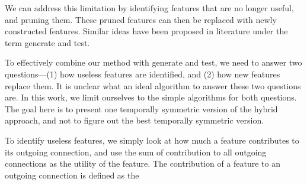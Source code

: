 \documentclass[twoside,11pt]{article}
\newcommand{\etal}{\textit{et al}.}
\begin{document}
We can address this limitation by identifying features that are no longer useful, and pruning them. These pruned features can then be replaced with newly constructed features. Similar ideas have been proposed in literature under the term generate and test. 

To effectively combine our method with generate and test, we need to answer two questions---(1) how useless features are identified, and (2) how new features replace them. It is unclear what an ideal algorithm to answer these two questions are. In this work, we limit ourselves to the simple algorithms for both questions. The goal here is to present one temporally symmetric version of the hybrid approach, and not to figure out the best temporally symmetric version. 

To identify useless features, we simply look at how much a feature contributes to its outgoing connection, and use the sum of contribution to all outgoing connections as the utility of the feature. The contribution of a feature to an outgoing connection is defined as the 







\end{document}
